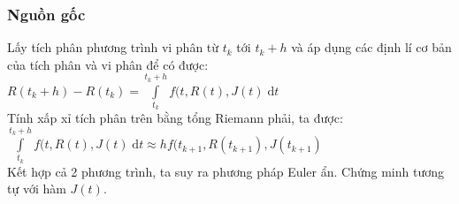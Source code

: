 \subsubsection{Nguồn gốc}
\hspace*{0.5cm} {Lấy tích phân phương trình vi phân từ $t_k$ tới $t_k + h$ và áp dụng các định lí cơ bản của tích phân và vi phân để có được:}\\
\hspace*{4cm} {$R(t_k + h) - R(t_k) = \displaystyle\int\limits_{t_k}^{t_k + h}f(
t, R(t), J(t)\;\mathrm{d}t$}\\
\hspace*{0.5cm} {Tính xấp xỉ tích phân trên bằng tổng Riemann phải, ta được:}\\
\hspace*{4cm} {$\displaystyle\int\limits_{t_k}^{t_k + h}f(t, R(t), J(t)\;\mathrm{d}t \approx hf(t_{k+1}, R(t_{k+1}), J(t_{k+1})$}\\
\hspace*{0.5cm} {Kết hợp cả 2 phương trình, ta suy ra phương pháp Euler ẩn. Chứng minh tương tự với hàm $J(t)$.}
